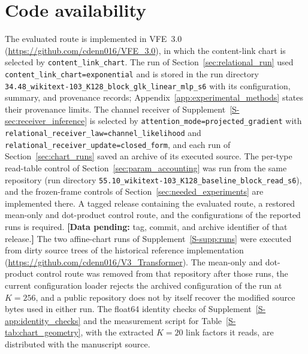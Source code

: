 \documentclass[twoside,11pt]{article}
\providecommand{\datapending}[1]{{\color{red!60!black}\textbf{[Data pending:} #1\textbf{]}}}
\begin{document}
\section*{Code availability}
The evaluated route is implemented in VFE~3.0 (\url{https://github.com/cdenn016/VFE_3.0}), in which the content-link chart is selected by \texttt{content\_\allowbreak link\_\allowbreak chart}. The run of Section~\ref{sec:relational_run} used \texttt{content\_\allowbreak link\_\allowbreak chart=\allowbreak exponential} and is stored in the run directory \texttt{34.48\_\allowbreak wikitext-103\_\allowbreak K128\_\allowbreak block\_\allowbreak glk\_\allowbreak linear\_\allowbreak mlp\_\allowbreak s6} with its configuration, summary, and provenance records; Appendix~\ref{app:experimental_methods} states their provenance limits. The channel receiver of Supplement~\ref{S-sec:receiver_inference} is selected by \texttt{attention\_\allowbreak mode=\allowbreak projected\_\allowbreak gradient} with \texttt{relational\_\allowbreak receiver\_\allowbreak law=\allowbreak channel\_\allowbreak likelihood} and \texttt{relational\_\allowbreak receiver\_\allowbreak update=\allowbreak closed\_\allowbreak form}, and each run of Section~\ref{sec:chart_runs} saved an archive of its executed source. The per-type read-table control of Section~\ref{sec:param_accounting} was run from the same repository (run directory \texttt{55.10\_\allowbreak wikitext-103\_\allowbreak K128\_\allowbreak baseline\_\allowbreak block\_\allowbreak read\_\allowbreak s6}), and the frozen-frame controls of Section~\ref{sec:needed_experiments} are implemented there. A tagged release containing the evaluated route, a restored mean-only and dot-product control route, and the configurations of the reported runs is required.
\datapending{tag, commit, and archive identifier of that release.} %
The two affine-chart runs of Supplement~\ref{S-supp:runs} were executed from dirty source trees of the historical reference implementation (\url{https://github.com/cdenn016/V3_Transformer}). The mean-only and dot-product control route was removed from that repository after those runs, the current configuration loader rejects the archived configuration of the run at $K=256$, and a public repository does not by itself recover the modified source bytes used in either run. The float64 identity checks of Supplement~\ref{S-app:identity_checks} and the measurement script for Table~\ref{S-tab:chart_geometry}, with the extracted $K=20$ link factors it reads, are distributed with the manuscript source.
\end{document}
